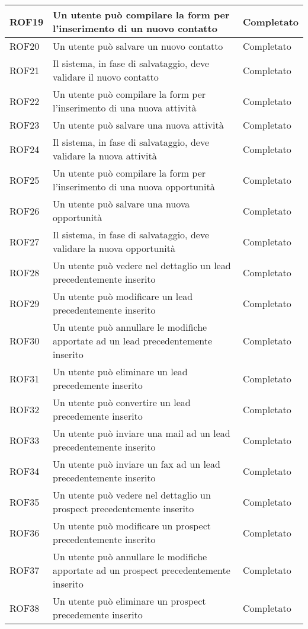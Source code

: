 \begin{longtable}[H]{|p{5cm}|p{5cm}|p{3cm}|}
	\hline
	ROF19&Un utente può compilare la form per l'inserimento di un nuovo contatto&Completato\\
	\hline
	ROF20&Un utente può salvare un nuovo contatto&Completato\\
	\hline
	ROF21&Il sistema, in fase di salvataggio, deve validare il nuovo contatto&Completato \\
	\hline
	ROF22&Un utente può compilare la form per l'inserimento di una nuova attività  &Completato\\
	\hline
	ROF23&Un utente può salvare una nuova attività&Completato\\
	\hline
	ROF24&Il sistema, in fase di salvataggio, deve validare la nuova attività&Completato \\
	\hline
	ROF25&Un utente può compilare la form per l'inserimento di una nuova opportunità  &Completato\\
	\hline
	ROF26&Un utente può salvare una nuova opportunità&Completato\\
	\hline
	ROF27&Il sistema, in fase di salvataggio, deve validare la nuova opportunità&Completato \\
	\hline
	ROF28&Un utente può vedere nel dettaglio un lead precedentemente inserito&Completato\\
	\hline
	ROF29&Un utente può modificare un lead precedentemente inserito&Completato\\
	\hline
	ROF30&Un utente può annullare le modifiche apportate ad un lead precedentemente inserito&Completato\\
	\hline
	ROF31&Un utente può eliminare un lead precedemente inserito&Completato\\
	\hline
	ROF32&Un utente può convertire un lead precedemente inserito&Completato\\
	\hline
	ROF33&Un utente può inviare una mail ad un lead precedentemente inserito&Completato \\
	\hline
	ROF34&Un utente può inviare un fax ad un lead precedentemente inserito&Completato \\
	\hline
	ROF35&Un utente può vedere nel dettaglio un prospect precedentemente inserito&Completato\\
	\hline
	ROF36&Un utente può modificare un prospect precedentemente inserito&Completato\\
	\hline
	ROF37&Un utente può annullare le modifiche apportate ad un prospect precedentemente inserito&Completato\\
	\hline
	ROF38&Un utente può eliminare un prospect precedemente inserito&Completato\\

\end{longtable}
